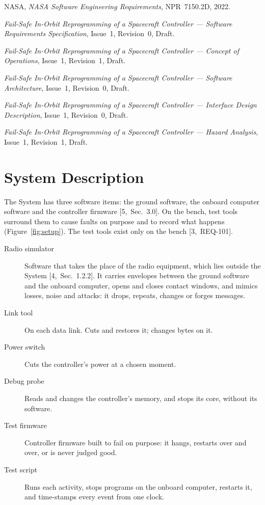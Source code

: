 \documentclass[11pt,a4paper]{article}
\begin{document}
\noindent [2] NASA, \emph{NASA Software Engineering Requirements},
NPR~7150.2D, 2022.

\noindent [3] \emph{Fail-Safe In-Orbit Reprogramming of a Spacecraft
Controller --- Software Requirements Specification}, Issue~1, Revision~0,
Draft.

\noindent [4] \emph{Fail-Safe In-Orbit Reprogramming of a Spacecraft
Controller --- Concept of Operations}, Issue~1, Revision~1, Draft.

\noindent [5] \emph{Fail-Safe In-Orbit Reprogramming of a Spacecraft
Controller --- Software Architecture}, Issue~1, Revision~0, Draft.

\noindent [6] \emph{Fail-Safe In-Orbit Reprogramming of a Spacecraft
Controller --- Interface Design Description}, Issue~1, Revision~0, Draft.

\noindent [7] \emph{Fail-Safe In-Orbit Reprogramming of a Spacecraft
Controller --- Hazard Analysis}, Issue~1, Revision~1, Draft.

\section{System Description}
The System has three software items: the ground software, the onboard
computer software and the controller firmware [5,~Sec.~3.0]. On the bench,
test tools surround them to cause faults on purpose and to record what
happens (Figure~\ref{fig:setup}). The test tools exist only on the bench
[3,~REQ-101].

\begin{description}
\item[Radio simulator] Software that takes the place of the radio equipment,
  which lies outside the System [4,~Sec.~1.2.2]. It carries envelopes between
  the ground software and the onboard computer, opens and closes contact
  windows, and mimics losses, noise and attacks: it drops, repeats, changes or
  forges messages.
\item[Link tool] On each data link. Cuts and restores it; changes bytes on it.
\item[Power switch] Cuts the controller's power at a chosen moment.
\item[Debug probe] Reads and changes the controller's memory, and stops its
  core, without its software.
\item[Test firmware] Controller firmware built to fail on purpose: it hangs,
  restarts over and over, or is never judged good.
\item[Test script] Runs each activity, stops programs on the onboard computer,
  restarts it, and time-stamps every event from one clock.
\end{description}
\end{document}
